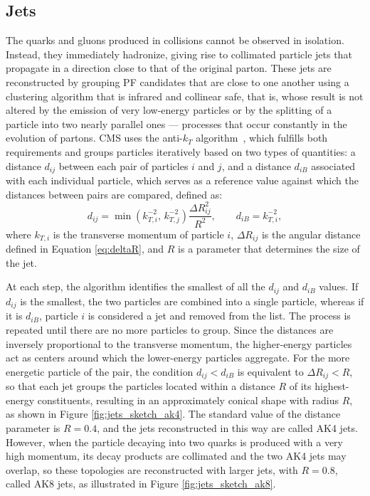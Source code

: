 \subsection{Jets}
\label{subsec:Jets}
%
The quarks and gluons produced in collisions cannot be observed in isolation. Instead, they immediately hadronize, giving rise to collimated particle jets that propagate in a direction close to that of the original parton. These jets are reconstructed by grouping PF candidates that are close to one another using a clustering algorithm that is infrared and collinear safe, that is, whose result is not altered by the emission of very low-energy particles or by the splitting of a particle into two nearly parallel ones — processes that occur constantly in the evolution of partons. CMS uses the anti-$k_T$ algorithm~\cite{Cacciari:2008gp}, which fulfills both requirements and groups particles iteratively based on two types of quantities: a distance $d_{ij}$ between each pair of particles $i$ and $j$, and a distance $d_{iB}$ associated with each individual particle, which serves as a reference value against which the distances between pairs are compared, defined as:
\begin{equation}
    d_{ij} = \min\left(k_{T,i}^{-2},\,k_{T,j}^{-2}\right)\frac{\Delta R_{ij}^2}{R^2}, \qquad d_{iB} = k_{T,i}^{-2},
    \label{eq:antikt}
\end{equation}
where $k_{T,i}$ is the transverse momentum of particle $i$, $\Delta R_{ij}$ is the angular distance defined in Equation \ref{eq:deltaR}, and $R$ is a parameter that determines the size of the jet.

At each step, the algorithm identifies the smallest of all the $d_{ij}$ and $d_{iB}$ values. If $d_{ij}$ is the smallest, the two particles are combined into a single particle, whereas if it is $d_{iB}$, particle $i$ is considered a jet and removed from the list. The process is repeated until there are no more particles to group. Since the distances are inversely proportional to the transverse momentum, the higher-energy particles act as centers around which the lower-energy particles aggregate. For the more energetic particle of the pair, the condition $d_{ij} < d_{iB}$ is equivalent to $\Delta R_{ij} < R$, so that each jet groups the particles located within a distance $R$ of its highest-energy constituents, resulting in an approximately conical shape with radius $R$, as shown in Figure \ref{fig:jets_sketch_ak4}. The standard value of the distance parameter is $R = 0.4$, and the jets reconstructed in this way are called AK4 jets. However, when the particle decaying into two quarks is produced with a very high momentum, its decay products are collimated and the two AK4 jets may overlap, so these topologies are reconstructed with larger jets, with $R = 0.8$, called AK8 jets, as illustrated in Figure \ref{fig:jets_sketch_ak8}.






